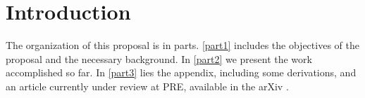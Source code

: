 \chapter{Introduction}



The organization of this proposal is in parts. \autoref{part1} includes the objectives of the proposal
and the necessary background. In \autoref{part2} we present the work accomplished so far. In \autoref{part3}
lies the appendix, including some derivations, and an article currently under review at PRE, available in the arXiv \cite{de_leeuw_diffusion_2012}.
